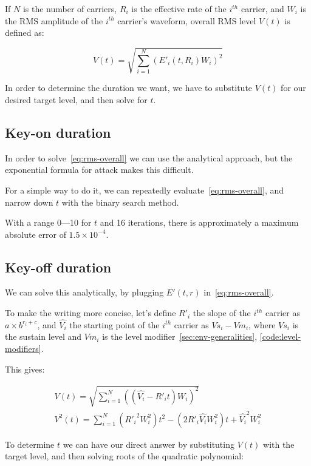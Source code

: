 \documentclass[twoside,twocolumn]{article}
\begin{document}
If $N$ is the number of carriers, $R_i$ is the effective rate of the $i^{th}$ carrier, and $W_i$
is the RMS amplitude of the $i^{th}$ carrier's waveform, overall RMS level $V(t)$ is defined as:

\begin{equation}
  V(t) = \sqrt{\sum_{i=1}^{N} {(E'_i(t,R_i) W_i)}^2}
  \label{eq:rms-overall}
\end{equation}

In order to determine the duration we want, we have to substitute $V(t)$ for our desired
target level, and then solve for $t$.

\subsection{Key-on duration}

In order to solve~\ref{eq:rms-overall} we can use the analytical approach, but the
exponential formula for attack makes this difficult.

For a simple way to do it, we can repeatedly evaluate~\ref{eq:rms-overall}, and narrow
down $t$ with the binary search method.

With a range 0—10 for $t$ and 16 iterations, there is approximately a maximum
absolute error of $1.5 \times 10^{-4}$.

\subsection{Key-off duration}

We can solve this analytically, by plugging $E'(t,r)$ in~\ref{eq:rms-overall}.

To make the writing more concise, let's define $R'_i$ the slope of the $i^{th}$ carrier as
$a \times b^{r_i+c}$, and $\hat{V_i}$ the starting point of the $i^{th}$ carrier as $Vs_i - Vm_i$, where
$Vs_i$ is the sustain level and $Vm_i$ is the level modifier~\ref{sec:env-generalities}, \ref{code:level-modifiers}.

This gives:

\begin{align*}
  V(t) = \sqrt{\sum_{i=1}^{N} {((\hat{V_i} - R'_i t) W_i)}^2} \\
  V^2(t) = \sum_{i=1}^{N} {({R'_i}^2 W_i^2) t^2 - (2 {R'_i} \hat{V_i} W_i^2) t + \hat{V_i}^2 W_i^2}
\end{align*}

To determine $t$ we can have our direct answer by substituting $V(t)$ with the target level, and then
solving roots of the quadratic polynomial:
\end{document}
